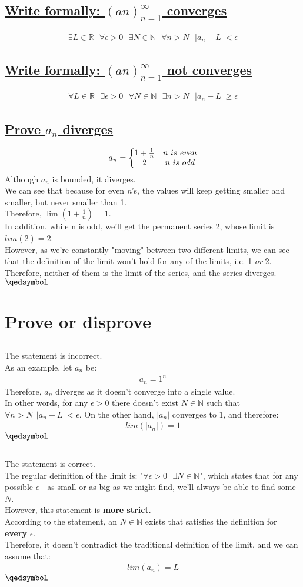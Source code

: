\documentclass[a4paper, 12pt]{article}
\newcommand{\sub}[1]{\subsection{\underline{#1}}}
\newcommand{\R}{\ensuremath{\mathbb{R}}}
\newcommand{\N}{\ensuremath{\mathbb{N}}}
\newcommand{\eq}[1]{\begin{align*}#1\end{align*}}
\renewcommand{\qed}{\hfill\(\qedsymbol\)}
\begin{document}
\section{}
\sub{Write formally: $(an)_{n=1}^\infty$ converges}
\eq{
    \exists{L}\in\R~~~\forall\epsilon>0~~~\exists{N}\in\N~~~\forall{n}>N~~~|a_n-L|<\epsilon
}
\sub{Write formally: $(an)_{n=1}^\infty$ not converges}
\eq{
    \forall{L}\in\R~~~\exists\epsilon>0~~~\forall{N}\in\N~~~\exists{n}>N~~~|a_n-L|\geq\epsilon
}
\sub{Prove $a_n$ diverges}
\eq{
    a_n=\bigg{\{}
    \begin{matrix}
        1+\frac{1}{n}&n~is~even\\
        2&n~is~odd
    \end{matrix}
}
Although $a_n$ is bounded, it diverges.\\
We can see that because for even \textit{n}'s, the values will keep getting smaller and smaller, but never smaller than 1.\\
Therefore, $\lim(1+\frac{1}{n})=1$.\\
In addition, while n is odd, we'll get the permanent series $2$, whose limit is $lim(2)=2$.\\
However, as we're constantly "moving" between two different limits, we can see that the definition of the limit won't hold for any of the limits, i.e. 1 \textit{or} 2.\\
Therefore, neither of them is the limit of the series, and the series diverges.
\qed\pagebreak

\section{Prove or disprove}
\setcounter{subsection}{1}
\sub{}
The statement is incorrect.\\
As an example, let $a_n$ be:
\eq{
    a_n=1^n
}
Therefore, $a_n$ diverges as it doesn't converge into a single value.\\
In other words, for any $\epsilon>0$ there doesn't exist $N\in\N$ such that $\forall{n}>N~~|a_n-L|<\epsilon$.
On the other hand, $|a_n|$ converges to $1$, and therefore:
\eq{
    lim(|a_n|)=1
}
\qed
\setcounter{subsection}{3}
\sub{}
The statement is correct.\\
The regular definition of the limit is: "$\forall\epsilon>0~~~\exists{N}\in\N$",
which states that for any possible $\epsilon$ - as small or as big as we might find,
we'll always be able to find some $N$.\\
However, this statement is \textbf{more strict}.\\
According to the statement, an $N\in\N$ exists that satisfies the definition for \textbf{every} $\epsilon$.\\
Therefore, it doesn't contradict the traditional definition of the limit, and we can assume that:
\eq{
    lim(a_n)=L
}
\qed
\pagebreak
\end{document}
